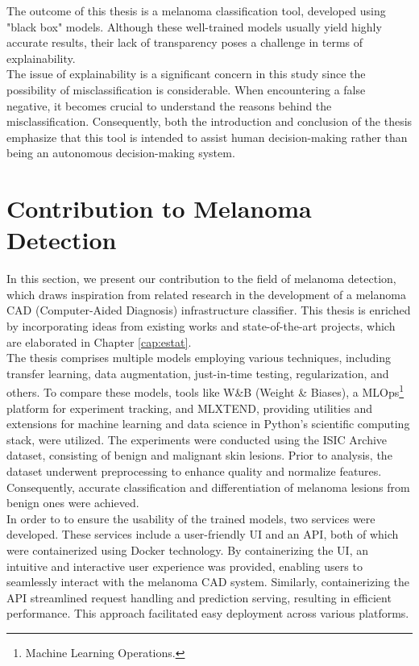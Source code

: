 The outcome of this thesis is a melanoma classification tool, developed using
"black box" models. Although these well-trained models usually yield highly
accurate results, their lack of transparency poses a challenge in terms of
explainability. \\

The issue of explainability is a significant concern in this study since the
possibility of misclassification is considerable. When encountering a false
negative, it becomes crucial to understand the reasons behind the
misclassification. Consequently, both the introduction and conclusion of the
thesis emphasize that this tool is intended to assist human decision-making
rather than being an autonomous decision-making system.

\section{Contribution to Melanoma Detection}

In this section, we present our contribution to the field of melanoma
detection, which draws inspiration from related research in the development of
a melanoma CAD (Computer-Aided Diagnosis) infrastructure classifier. This
thesis is enriched by incorporating ideas from existing works and
state-of-the-art projects, which are elaborated in Chapter \ref{cap:estat}. \\

The thesis comprises multiple models employing various techniques, including
transfer learning, data augmentation, just-in-time testing, regularization, and
others. To compare these models, tools like W\&B (Weight \& Biases), a
MLOps\footnote{Machine Learning Operations.} platform for experiment tracking,
and MLXTEND, providing utilities and extensions for machine learning and data
science in Python's scientific computing stack, were utilized. The experiments
were conducted using the ISIC Archive dataset, consisting of benign and
malignant skin lesions. Prior to analysis, the dataset underwent preprocessing
to enhance quality and normalize features. Consequently, accurate
classification and differentiation of melanoma lesions from benign ones were
achieved. \\

In order to to ensure the usability of the trained models,
two services were developed. These services include a user-friendly UI and an
API, both of which were containerized using Docker technology. By
containerizing the UI, an intuitive and interactive user experience was
provided, enabling users to seamlessly interact with the melanoma CAD system.
Similarly, containerizing the API streamlined request handling and prediction
serving, resulting in efficient performance. This approach facilitated easy
deployment across various platforms.
